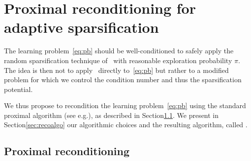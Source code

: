 \section{Proximal reconditioning for adaptive sparsification}\label{sec:spy_recon}


The learning problem~\eqref{eq:pb} should be well-conditioned to safely apply the random sparsification technique of \spyI~with reasonable exploration probability $\pi$. The idea is then not to apply \spyI~directly to~\eqref{eq:pb} but rather to a modified problem for which we control the condition number and thus the sparsification potential. 

We thus propose to recondition the learning problem~\eqref{eq:pb} using the standard proximal algorithm (see e.g.\;\cite{rockafellar1976monotone}), as described in Section\;\ref{sec:proxrecon}. We present in Section\;\ref{sec:recoalgo} our algorithmic choices and the resulting algorithm, called \recoalgo.


\subsection{Proximal reconditioning}\label{sec:proxrecon}

